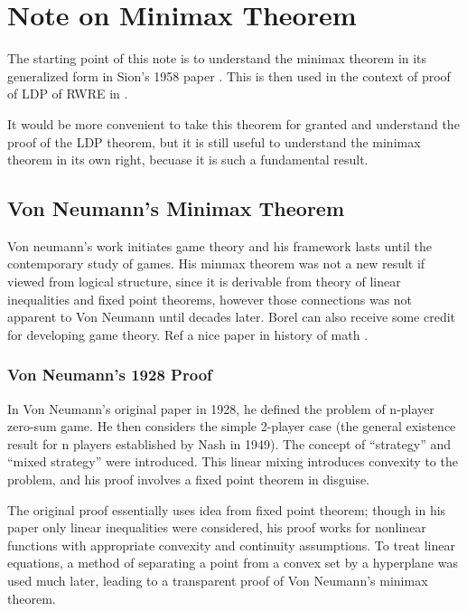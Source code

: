 \section{Note on Minimax Theorem}

The starting point of this note is to understand the minimax theorem in its generalized form in Sion's 1958 paper \autocite{sionGeneralMinimax1958}. This is then used in the context of proof of LDP of RWRE in \autocite[Theorem~5]{cometsQuenchedAnnealed2000}. 

It would be more convenient to take this theorem for granted and understand the proof of the LDP theorem, but it is still useful to understand the minimax theorem in its own right, becuase it is such a fundamental result.


\subsection{Von Neumann’s Minimax Theorem}
Von neumann’s work initiates game theory and his framework lasts until the contemporary study of games. His minmax theorem was not a new result if viewed from logical structure, since it is derivable from theory of linear inequalities and fixed point theorems, however those connections was not apparent to Von Neumann until decades later. Borel can also receive some credit for developing game theory. Ref a nice paper in history of math \autocite{kjeldsenJohnNeumanns2001}.

\subsubsection{Von Neumann’s 1928 Proof}

In Von Neumann’s original paper in 1928, he defined the problem of n-player zero-sum game. He then considers the simple 2-player case (the general existence result for n players established by Nash in 1949). The concept of “strategy” and “mixed strategy” were introduced. This linear mixing introduces convexity to the problem, and his proof involves a fixed point theorem in disguise.

The original proof essentially uses idea from fixed point theorem; though in his paper only linear inequalities were considered, his proof works for nonlinear functions with appropriate convexity and continuity assumptions. To treat linear equations, a method of separating a point from a convex set by a hyperplane was used much later, leading to a transparent proof of Von Neumann’s minimax theorem.

